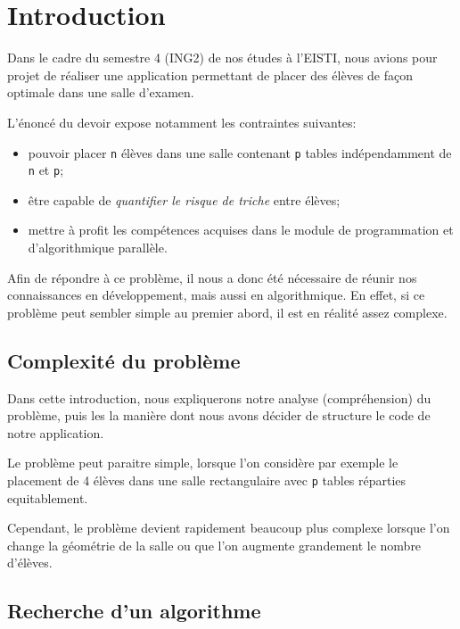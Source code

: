 \documentclass[11pt,a4paper, openany]{book}
\begin{document}
\pagebreak
\newpage


\newpage
\tableofcontents
\thispagestyle{empty}
\newpage

\chapter*{Introduction}

Dans le cadre du semestre 4 (ING2) de nos études à l'EISTI, nous avions pour projet de réaliser une application permettant de placer des élèves de façon optimale dans une salle d'examen.

L'énoncé du devoir expose notamment les contraintes suivantes:

\begin{itemize}
\item pouvoir placer \texttt{n} élèves dans une salle contenant \texttt{p} tables indépendamment de \texttt{n} et \texttt{p};
\item être capable de \textit{quantifier le risque de triche} entre élèves;
\item mettre à profit les compétences acquises dans le module de programmation et d'algorithmique parallèle.
\end{itemize}

Afin de répondre à ce problème, il nous a donc été nécessaire de réunir nos connaissances en développement, mais aussi en algorithmique. En effet, si ce problème peut sembler simple au premier abord, il est en réalité assez complexe.

\section*{Complexité du problème}

Dans cette introduction, nous expliquerons notre analyse (compréhension) du problème, puis les la manière dont nous avons décider de structure le code de notre application.

Le problème peut paraitre simple, lorsque l'on considère par exemple le placement de 4 élèves dans une salle rectangulaire avec \texttt{p} tables réparties equitablement.

Cependant, le problème devient rapidement beaucoup plus complexe lorsque l'on change la géométrie de la salle ou que l'on augmente grandement le nombre d'élèves.

\section*{Recherche d'un algorithme}
\end{document}
